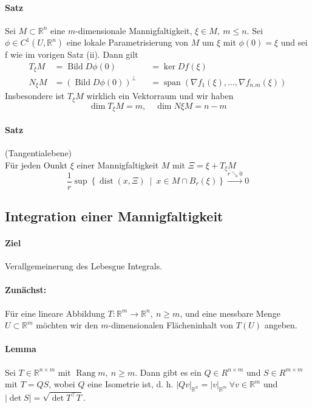 \documentclass[12pt,a4paper,fleqn]{article}
\def\abs#1{{\left\vert #1 \right\vert}}
\def\set#1{{\left\{ #1 \right\}}}
\def\Mid{\ \middle|\ }
\def\R{{\mathbb{R}}}
\begin{document}
\paragraph{Satz} Sei $M \subset \R^n$ eine $m$-dimensionale Mannigfaltigkeit, $\xi \in M,\ m \leq n$. Sei $\phi \in C^1(U, \R^n)$ eine lokale Parametrisierung von $M$ um $\xi$ mit $\phi(0) = \xi$ und sei f wie im vorigen Satz (ii). Dann gilt
\begin{align*}
T_\xi M &= \operatorname{Bild} D\phi(0) &&= \ker Df(\xi) \\
N_\xi M &= (\operatorname{Bild} D\phi(0))^\perp &&= \operatorname{span}(\nabla f_1(\xi), \dots, \nabla f_{n.m}(\xi))
\end{align*}
Insbesondere ist $T_\xi M$ wirklich ein Vektorraum und wir haben 
\begin{displaymath}
\dim T_\xi M = m,\quad \dim N\xi M = n-m
\end{displaymath}
\paragraph{Satz} (Tangentialebene)\\
Für jeden Ounkt $\xi$ einer Mannigfaltigkeit $M$ mit $\Xi = \xi + T_\xi M$
\begin{displaymath}
\frac{1}{r}\sup\set{\operatorname{dist}(x, \Xi) \Mid x \in M\cap B_r(\xi)} \xrightarrow{r \searrow 0} 0
\end{displaymath}

\subsection{Integration einer Mannigfaltigkeit}

\paragraph{Ziel} Verallgemeinerung des Lebesgue Integrals.

\paragraph{Zunächst:} Für eine lineare Abbildung $T \colon \R^m \rightarrow \R^n,\ n \geq m$, und eine messbare Menge $U \subset \R^m$ möchten wir den $m$-dimensionalen Flächeninhalt von $T(U)$ angeben.

\paragraph{Lemma} Sei $T \in \R^{n \times m}$ mit $\operatorname{Rang} m,\ n \geq m$. Dann gibt es ein $Q \in R^{n \times m}$ und $S \in R^{m \times m}$ mit $T = QS$, wobei $Q$ eine Isometrie ist, d. h. $\abs{Qv}_{\R^n} = \abs{v}_{\R^m}\ \forall v \in \R^m$ und $\abs{\det S} = \sqrt{\det T^\top T}$.
\end{document}
